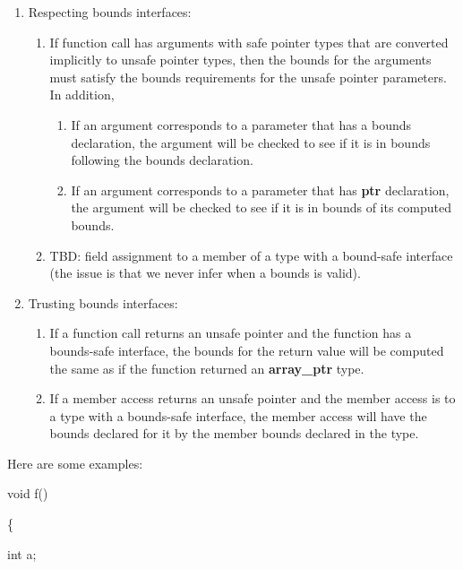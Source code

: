 \documentclass[]{article}
\begin{document}
\begin{enumerate}
\def\labelenumi{\arabic{enumi}.}
\item
  Respecting bounds interfaces:

  \begin{enumerate}
  \def\labelenumii{\alph{enumii}.}
  \item
    If function call has arguments with safe pointer types that are
    converted implicitly to unsafe pointer types, then the bounds for
    the arguments must satisfy the bounds requirements for the unsafe
    pointer parameters. In addition,

    \begin{enumerate}
    \def\labelenumiii{\roman{enumiii}.}
    \item
      If an argument corresponds to a parameter that has a bounds
      declaration, the argument will be checked to see if it is in
      bounds following the bounds declaration.
    \item
      If an argument corresponds to a parameter that has \textbf{ptr}
      declaration, the argument will be checked to see if it is in
      bounds of its computed bounds.
    \end{enumerate}
  \item
    TBD: field assignment to a member of a type with a bound-safe
    interface (the issue is that we never infer when a bounds is valid).
  \end{enumerate}
\item
  Trusting bounds interfaces:

  \begin{enumerate}
  \def\labelenumii{\alph{enumii}.}
  \item
    If a function call returns an unsafe pointer and the function has a
    bounds-safe interface, the bounds for the return value will be
    computed the same as if the function returned an \textbf{array\_ptr}
    type.
  \item
    If a member access returns an unsafe pointer and the member access
    is to a type with a bounds-safe interface, the member access will
    have the bounds declared for it by the member bounds declared in the
    type.
  \end{enumerate}
\end{enumerate}

Here are some examples:

void f()

\{

int a;
\end{document}

